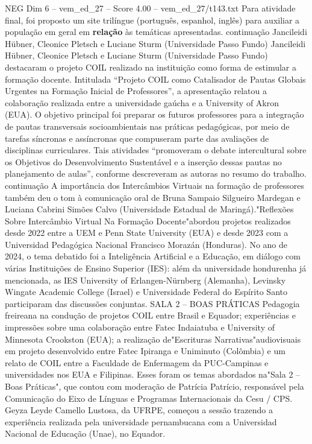 \begin{textsample}{NEG Dim 6 – vem\_ed\_27 – Score 4.00 – vem\_ed\_27/t143.txt}
Para atividade final, foi proposto um site trilíngue (português, espanhol, inglês) para auxiliar a população em geral em \textbf{relação} às temáticas apresentadas. continuação Jancileidi Hübner, Cleonice Pletsch e Luciane Sturm (Universidade Passo Fundo) Jancileidi Hübner, Cleonice Pletsch e Luciane Sturm (Universidade Passo Fundo) destacaram o projeto COIL realizado na instituição como forma de estimular a formação docente.
Intitulada “Projeto COIL como Catalisador de Pautas Globais Urgentes na Formação Inicial de Professores”, a apresentação relatou a colaboração realizada entre a universidade gaúcha e a University of Akron (EUA).
O objetivo principal foi preparar os futuros professores para a integração de pautas transversais socioambientais nas práticas pedagógicas, por meio de tarefas síncronas e assíncronas que compuseram parte das avaliações de disciplinas curriculares.
Tais atividades “promoveram o debate intercultural sobre os Objetivos do Desenvolvimento Sustentável e a inserção dessas pautas no planejamento de aulas”, conforme descreveram as autoras no resumo do trabalho. continuação A importância dos Intercâmbios Virtuais na formação de professores também deu o tom à comunicação oral de Bruna Sampaio Silgueiro Mardegan e Luciana Cabrini Simões Calvo (Universidade Estadual de Maringá)."Reflexões Sobre Intercâmbio Virtual Na Formação Docente"abordou projetos realizados desde 2022 entre a UEM e Penn State University (EUA) e desde 2023 com a Universidad Pedagógica Nacional Francisco Morazán (Honduras).
No ano de 2024, o tema debatido foi a Inteligência Artificial e a Educação, em diálogo com várias Instituições de Ensino Superior (IES): além da universidade hondurenha já mencionada, as IES University of Erlangen-Nürnberg (Alemanha), Levinsky Wingate Academic College (Israel) e Universidade Federal do Espírito Santo participaram das discussões conjuntas.
SALA 2 – BOAS PRÁTICAS Pedagogia freireana na condução de projetos COIL entre Brasil e Equador; experiências e impressões sobre uma colaboração entre Fatec Indaiatuba e University of Minnesota Crookston (EUA); a realização de"Escrituras Narrativas"audiovisuais em projeto desenvolvido entre Fatec Ipiranga e Uniminuto (Colômbia) e um relato de COIL entre a Faculdade de Enfermagem da PUC-Campinas e universidades nos EUA e Filipinas.
Esses foram os temas abordados na"Sala 2 – Boas Práticas", que contou com moderação de Patrícia Patrício, responsável pela Comunicação do Eixo de Línguas e Programas Internacionais da Cesu / CPS.
Geyza Leyde Camello Lustosa, da UFRPE, começou a sessão trazendo a experiência realizada pela universidade pernambucana com a Universidad Nacional de Educação (Unae), no Equador.

\end{textsample}
